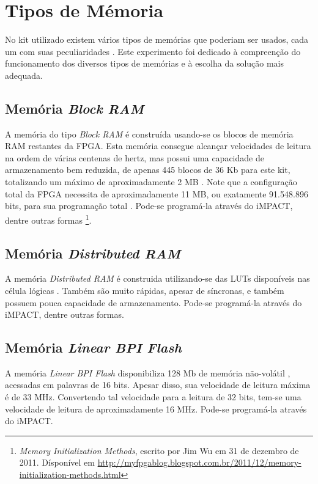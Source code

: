 \documentclass[11pt,a4paper,oneside]{book}
\begin{document}
\section{Tipos de Mémoria}

No kit utilizado existem vários tipos de memórias que poderiam ser usados, cada um com suas peculiaridades \cite{ug810}.
Este experimento foi dedicado à compreenção do funcionamento dos diversos tipos de memórias e à escolha da solução mais adequada.

\subsection{Memória \textit{Block RAM}}
A memória do tipo \textit{Block RAM} é construída usando-se os blocos de memória RAM restantes da FPGA.
Esta memória consegue alcançar velocidades de leitura na ordem de várias centenas de hertz, mas possui uma capacidade de armazenamento bem reduzida, de apenas 445 blocos de 36 Kb para este kit, totalizando um máximo de aproximadamente 2 MB \cite{ug473, wp377}.
Note que a configuração total da FPGA necessita de aproximadamente 11 MB, ou exatamente 91.548.896 bits, para sua programação total \cite{ug470}.
Pode-se programá-la através do iMPACT, dentre outras formas \footnote{\textit{Memory Initialization Methods}, escrito por Jim Wu em 31 de dezembro de 2011. Dísponível em \url{http://myfpgablog.blogspot.com.br/2011/12/memory-initialization-methods.html}}.

\subsection{Memória \textit{Distributed RAM}}
A memória \textit{Distributed RAM} é construida utilizando-se das LUTs disponíveis nas célula lógicas \cite{ug473, wp377}.
Também são muito rápidas, apesar de síncronas, e também possuem pouca capacidade de armazenamento.
Pode-se programá-la através do iMPACT, dentre outras formas.

\subsection{Memória \textit{Linear BPI Flash}}
A memória \textit{Linear BPI Flash} disponibiliza 128 Mb de memória não-volátil \cite{ug810}, acessadas em palavras de 16 bits.
Apesar disso, sua velocidade de leitura máxima é de 33 MHz.
Convertendo tal velocidade para a leitura de 32 bits, tem-se uma velocidade de leitura de aproximadamente 16 MHz.
Pode-se programá-la através do iMPACT.
\end{document}
